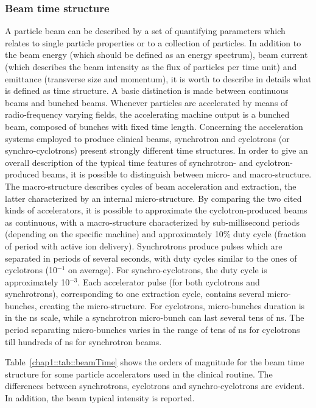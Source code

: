 \subsubsection{Beam time structure}\label{chap1::subsubsection::beamTimeStruct}

A particle beam can be described by a set of quantifying parameters which relates to single particle properties or to a collection of particles. In addition to the beam energy (which should be defined as an energy spectrum), beam current (which describes the beam intensity as the flux of particles per time unit) and emittance (transverse size and momentum), it is worth to describe in details what is defined as time structure. A basic distinction is made between continuous beams and bunched beams. Whenever particles are accelerated by means of radio-frequency varying fields, the accelerating machine output is a bunched beam, composed of bunches with fixed time length. Concerning the acceleration systems employed to produce clinical beams, synchrotron and cyclotrons (or synchro-cyclotrons) present strongly different time structures. In order to give an overall description of the typical time features of synchrotron- and cyclotron-produced beams, it is possible to distinguish between micro- and macro-structure. The macro-structure describes cycles of beam acceleration and extraction, the latter characterized by an internal micro-structure. By comparing the two cited kinds of accelerators, it is possible to approximate the cyclotron-produced beams as continuous, with a macro-structure characterized by sub-millisecond periods (depending on the specific machine) and approximately 10\% duty cycle (fraction of period with active ion delivery). Synchrotrons produce pulses which are separated in periods of several seconds, with duty cycles similar to the ones of cyclotrons (10$^{-1}$ on average). For synchro-cyclotrons, the duty cycle is approximately 10$^{-3}$. Each accelerator pulse (for both cyclotrons and synchrotrons), corresponding to one extraction cycle, contains several micro-bunches, creating the micro-structure. For cyclotrons, micro-bunches duration is in the ns scale, while a synchrotron micro-bunch can last several tens of ns. The period separating micro-bunches varies in the range of tens of ns for cyclotrons till hundreds of ns for synchrotron beams. 

Table~\ref{chap1::tab::beamTime} shows the orders of magnitude for the beam time structure for some particle accelerators used in the clinical routine. The differences between synchrotrons, cyclotrons and synchro-cyclotrons are evident. In addition, the beam typical intensity is reported.

